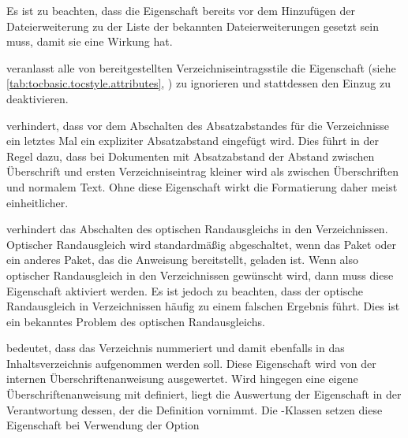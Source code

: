 \begin{description}
  Es ist zu beachten, dass die Eigenschaft bereits vor dem
  Hinzufügen der Dateierweiterung zu der Liste der bekannten
  Dateierweiterungen gesetzt sein muss, damit sie eine Wirkung hat.
\item[\PValue{noindent}] veranlasst alle
  von \KOMAScript{} bereitgestellten Verzeichniseintragsstile die Eigenschaft
   (siehe \autoref{tab:tocbasic.tocstyle.attributes},
  ) zu ignorieren und
  stattdessen den Einzug zu deaktivieren.
\item[\PValue{noparskipfake}] verhindert,
  dass vor dem Abschalten des Absatzabstandes für die Verzeichnisse ein
  letztes Mal ein expliziter Absatzabstand eingefügt wird. Dies führt in der
  Regel dazu, dass bei Dokumenten mit Absatzabstand der Abstand zwischen
  Überschrift und ersten Verzeichniseintrag kleiner
  wird als zwischen Überschriften und normalem Text. %
  \iffalse%
  Normalerweise erhält man daher ohne diese Eigenschaft eine einheitlichere
  Formatierung.%
  \else%
  Ohne diese Eigenschaft wirkt die Formatierung daher meist einheitlicher.%
  \fi%
\item[\PValue{noprotrusion}] verhindert
  das Abschalten des optischen Randausgleichs in den Verzeichnissen. Optischer
  Randausgleich wird standardmäßig abgeschaltet, wenn das Paket
   oder ein anderes Paket, das die
  Anweisung  bereitstellt,
  geladen ist. Wenn also optischer Randausgleich in den Verzeichnissen
  gewünscht wird, dann muss diese Eigenschaft aktiviert
  werden. Es ist jedoch zu beachten, dass der optische
  Randausgleich in Verzeichnissen häufig zu einem falschen Ergebnis
  führt. Dies ist ein bekanntes Problem des optischen Randausgleichs.
\item[\PValue{numbered}] bedeutet, dass das Verzeichnis nummeriert und damit
  ebenfalls in das Inhaltsverzeichnis aufgenommen werden soll. Diese
  Eigenschaft wird von der internen Überschriftenanweisung ausgewertet. Wird
  hingegen eine eigene Überschriftenanweisung mit
   definiert, liegt die Auswertung der
  Eigenschaft in der Verantwortung dessen, der die Definition vornimmt.  Die
  \KOMAScript-Klassen setzen diese Eigenschaft bei Verwendung der Option

\end{description}
